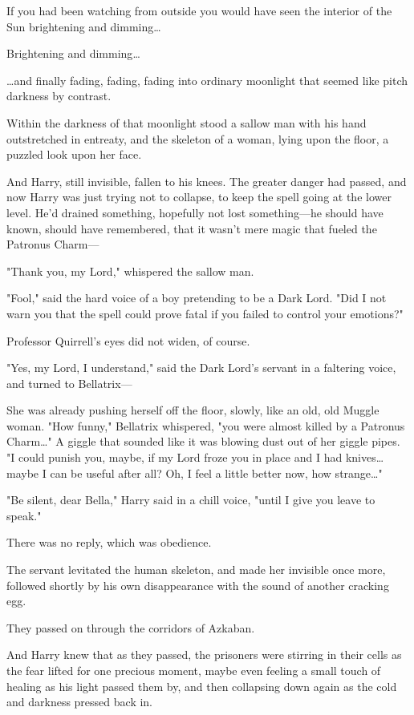 If you had been watching from outside you would have seen the interior of the 
Sun brightening and dimming{\ldots}

Brightening and dimming{\ldots}

{\ldots}and finally fading, fading, fading into ordinary moonlight that seemed 
like pitch darkness by contrast.

Within the darkness of that moonlight stood a sallow man with his hand 
outstretched in entreaty, and the skeleton of a woman, lying upon the floor, a 
puzzled look upon her face.

And Harry, still invisible, fallen to his knees. The greater danger had passed, 
and now Harry was just trying not to collapse, to keep the spell going at the 
lower level. He'd drained something, hopefully not lost something---he 
should have known, should have remembered, that it wasn't mere magic that 
fueled the Patronus Charm---

"Thank you, my Lord," whispered the sallow man.

"Fool," said the hard voice of a boy pretending to be a Dark Lord. "Did I not 
warn you that the spell could prove fatal if you failed to control your 
emotions?"

Professor Quirrell's eyes did not widen, of course.

"Yes, my Lord, I understand," said the Dark Lord's servant in a faltering 
voice, and turned to Bellatrix---

She was already pushing herself off the floor, slowly, like an old, old Muggle 
woman. "How funny," Bellatrix whispered, "you were almost killed by a Patronus 
Charm{\ldots}" A giggle that sounded like it was blowing dust out of her giggle 
pipes. "I could punish you, maybe, if my Lord froze you in place and I had 
knives{\ldots} maybe I can be useful after all? Oh, I feel a little better now, 
how strange{\ldots}"

"Be silent, dear Bella," Harry said in a chill voice, "until I give you leave 
to speak."

There was no reply, which was obedience.

The servant levitated the human skeleton, and made her invisible once more, 
followed shortly by his own disappearance with the sound of another cracking 
egg.

They passed on through the corridors of Azkaban.

And Harry knew that as they passed, the prisoners were stirring in their cells 
as the fear lifted for one precious moment, maybe even feeling a small touch of 
healing as his light passed them by, and then collapsing down again as the cold 
and darkness pressed back in.

